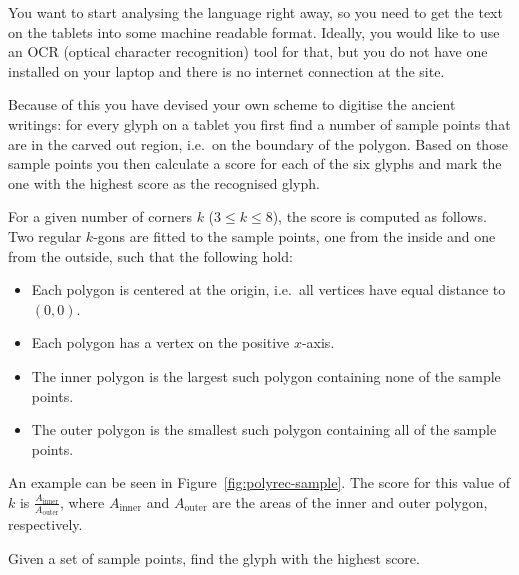 You want to start analysing the language right away, so you need to
get the text on the tablets into some machine readable format.
Ideally, you would like to use an OCR (optical character recognition)
tool for that, but you do not have one installed on your laptop and
there is no internet connection at the site.

Because of this you have devised your own scheme to digitise the
ancient writings: for every glyph on a tablet you first find a number
of sample points that are in the carved out region, i.e.~on the
boundary of the polygon. Based on those sample points you then
calculate a score for each of the six glyphs and mark the one with the
highest score as the recognised glyph.


For a given number of corners $k$ ($3 \le k \le 8$), the score is
computed as follows. Two regular $k$-gons are fitted to the sample
points, one from the inside and one from the outside, such that the
following hold:

\begin{itemize}
  \item Each polygon is centered at the origin, i.e.~all vertices have
  equal distance to $(0,0)$.
  \item Each polygon has a vertex on the positive $x$-axis.
  \item The inner polygon is the largest such polygon containing none
  of the sample points.
  \item The outer polygon is the smallest such polygon containing all
  of the sample points.
\end{itemize}

An example can be seen in Figure~\ref{fig:polyrec-sample}.
The score for this value of $k$ is $\frac{A_\text{inner}}{A_\text{outer}}$,
where $A_\text{inner}$ and $A_\text{outer}$ are the areas of the inner and
outer polygon, respectively.

Given a set of sample points, find the glyph with the highest score.

